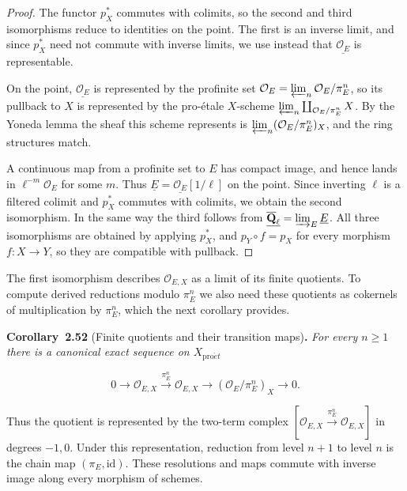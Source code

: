 \documentclass[11pt]{article}
\newenvironment{bpstatement}[2]{\par\addvspace{0.6\baselineskip}\noindent\textbf{#1}#2\textbf{.}\enspace\ignorespaces}
  {\par\addvspace{0.4\baselineskip}}
\newenvironment{bpstatementit}[2]{\begin{bpstatement}{#1}{#2}\itshape\ignorespaces}{\end{bpstatement}}
\begin{document}
\begin{proof}[{Proof}]\label{bp159}%
The functor \(p_X^*\) commutes with colimits, so the second and third isomorphisms reduce to identities on the point. The first is an inverse limit, and since \(p_X^*\) need not commute with inverse limits, we use instead that \(\underline{\mathcal O_E}\) is representable.

On the point, \(\underline{\mathcal O_E}\) is represented by the profinite set \(\mathcal O_E=\varprojlim_n\mathcal O_E/\pi_E^n\), so its pullback to \(X\) is represented by the pro-étale \(X\)-scheme \(\varprojlim_n\coprod_{\mathcal O_E/\pi_E^n}X\). By the Yoneda lemma the sheaf this scheme represents is \(\varprojlim_n(\mathcal O_E/\pi_E^n)_X\), and the ring structures match.

A continuous map from a profinite set to \(E\) has compact image, and hence lands in \(\ell^{-m}\mathcal O_E\) for some \(m\). Thus \(\underline E=\underline{\mathcal O_E}[1/\ell]\) on the point. Since inverting \(\ell\) is a filtered colimit and \(p_X^*\) commutes with colimits, we obtain the second isomorphism. In the same way the third follows from \(\underline{\overline{\mathbf Q}_\ell}=\varinjlim_E\underline E\). All three isomorphisms are obtained by applying \(p_X^*\), and \(p_Y\circ f=p_X\) for every morphism \(f:X\to Y\), so they are compatible with pullback.
\end{proof}

\label{bp160}%
The first isomorphism describes \(\mathcal O_{E,X}\) as a limit of its finite quotients. To compute derived reductions modulo \(\pi_E^n\) we also need these quotients as cokernels of multiplication by \(\pi_E^n\), which the next corollary provides.

\label{bp161}%
\begin{bpstatementit}{Corollary~2.52}{ (Finite quotients and their transition maps)}
For every \(n\geq1\) there is a canonical exact sequence on \(X_{\mathrm{pro}\acute{e}t}\)

\[
0\longrightarrow\mathcal O_{E,X}
\xrightarrow{\pi_E^n}\mathcal O_{E,X}
\longrightarrow(\mathcal O_E/\pi_E^n)_X\longrightarrow0.
\]

Thus the quotient is represented by the two-term complex \([\mathcal O_{E,X}\xrightarrow{\pi_E^n}\mathcal O_{E,X}]\) in degrees \(-1,0\). Under this representation, reduction from level \(n+1\) to level \(n\) is the chain map \((\pi_E,\mathrm{id})\). These resolutions and maps commute with inverse image along every morphism of schemes.
\end{bpstatementit}
\end{document}
